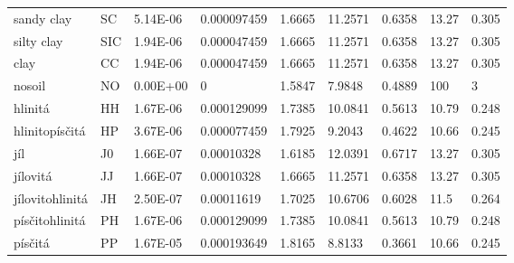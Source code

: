 \begin{sidewaystable}
{\begin{tabular}{lllllllll}
sandy clay      & SC       & 5.14E-06  & 0.000097459   & 1.6665 & 11.2571 & 0.6358 & 13.27 & 0.305 \\
silty clay      & SIC      & 1.94E-06  & 0.000047459   & 1.6665 & 11.2571 & 0.6358 & 13.27 & 0.305 \\
clay            & CC       & 1.94E-06  & 0.000047459   & 1.6665 & 11.2571 & 0.6358 & 13.27 & 0.305 \\
nosoil          & NO       & 0.00E+00  & 0             & 1.5847 & 7.9848  & 0.4889 & 100   & 3     \\
hlinitá         & HH       & 1.67E-06  & 0.000129099   & 1.7385 & 10.0841 & 0.5613 & 10.79 & 0.248 \\
hlinitopísčitá  & HP       & 3.67E-06  & 0.000077459   & 1.7925 & 9.2043  & 0.4622 & 10.66 & 0.245 \\
jíl             & J0       & 1.66E-07  & 0.00010328    & 1.6185 & 12.0391 & 0.6717 & 13.27 & 0.305 \\
jílovitá        & JJ       & 1.66E-07  & 0.00010328    & 1.6665 & 11.2571 & 0.6358 & 13.27 & 0.305 \\
jílovitohlinitá & JH       & 2.50E-07  & 0.00011619    & 1.7025 & 10.6706 & 0.6028 & 11.5  & 0.264 \\
písčitohlinitá  & PH       & 1.67E-06  & 0.000129099   & 1.7385 & 10.0841 & 0.5613 & 10.79 & 0.248 \\
písčitá         & PP       & 1.67E-05  & 0.000193649   & 1.8165 & 8.8133  & 0.3661 & 10.66 & 0.245 \\
\hline
\end{tabular}
}
\end{sidewaystable}